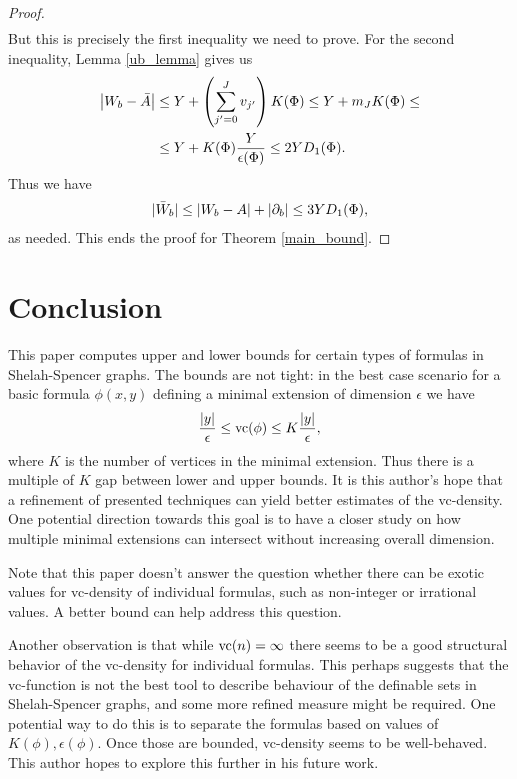 \begin{proof}
\begin{align*}
  \end{align*}
  But this is precisely the first inequality we need to prove.
  For the second inequality, Lemma \ref{ub_lemma} gives us
  \begin{align*}
    \left|W_b - \bar A\right| &\leq Y + \left(\sum_{j'=0}^J v_{j'}\right) K(\Phi) \leq Y + m_J K(\Phi) \leq \\
    &\leq Y + K(\Phi) \frac{Y}{\epsilon(\Phi)} \leq 2 Y D_1(\Phi).
  \end{align*}
  Thus we have
  \begin{align*}
      |\bar W_b| \leq \left|W_b - A\right| + \left|\partial_b\right| \leq 3 Y D_1(\Phi),
  \end{align*}
  as needed.
  This ends the proof for Theorem \ref{main_bound}.
\end{proof}


\section{Conclusion}

This paper computes upper and lower bounds for certain types of formulas in Shelah-Spencer graphs.
The bounds are not tight: in the best case scenario for a basic formula $\phi(x,y)$ defining a minimal extension of
dimension $\epsilon$ we have
\begin{align*}
  \frac{|y|}{\epsilon} \leq \operatorname{vc}(\phi) \leq K \frac{|y|}{\epsilon},
\end{align*}
where $K$ is the number of vertices in the minimal extension.
Thus there is a multiple of $K$ gap between lower and upper bounds.
It is this author's hope that a refinement of presented techniques can yield better estimates of the vc-density.
One potential direction towards this goal is to have a closer study on
how multiple minimal extensions can intersect without increasing overall dimension.

Note that this paper doesn't answer the question whether there can be exotic values for vc-density of individual formulas,
such as non-integer or irrational values.
A better bound can help address this question.

Another observation is that while $\operatorname{vc}(n) = \infty$ there seems to be a good structural behavior of the vc-density for individual formulas.
This perhaps suggests that the vc-function is not the best tool to describe behaviour of the definable sets in Shelah-Spencer graphs,
and some more refined measure might be required.
One potential way to do this is to separate the formulas based on values of $K(\phi), \epsilon(\phi)$.
Once those are bounded, vc-density seems to be well-behaved.
This author hopes to explore this further in his future work.
